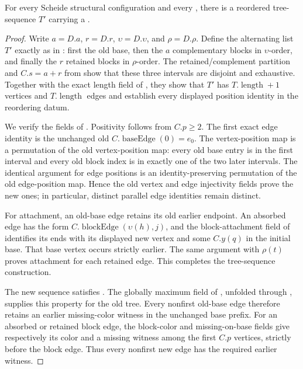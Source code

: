 \begin{helper}
For every Scheide structural configuration and every
, there is a reordered
tree-sequence $T'$ carrying a
.
\end{helper}
\begin{proof}
Write $a=D.a$, $r=D.r$, $\upsilon=D.\upsilon$, and $\rho=D.\rho$.
Define the alternating list $T'$ exactly as in
: first the old base, then the
$a$ complementary blocks in $\upsilon$-order, and finally the $r$ retained
blocks in $\rho$-order.  The retained/complement partition and
$C.s=a+r$ from  show that these
three intervals are disjoint and exhaustive.  Together with the exact
length field of , they show that
$T'$ has $T.\operatorname{length}+1$ vertices and
$T.\operatorname{length}$ edges and establish every displayed position
identity in the reordering datum.

We verify the fields of .  Positivity follows from
$C.p\ge2$.  The first exact edge identity is the unchanged old
$C.\operatorname{baseEdge}(0)=e_0$.  The vertex-position map is a
permutation of the old vertex-position map: every old base entry is in the
first interval and every old block index is in exactly one of the two
later intervals.  The identical argument for edge positions is an
identity-preserving permutation of the old edge-position map.  Hence the
old vertex and edge injectivity fields prove the new ones; in particular,
distinct parallel edge identities remain distinct.

For attachment, an old-base edge retains its old earlier endpoint.  An
absorbed edge has the form
$C.\operatorname{blockEdge}(\upsilon(h),j)$, and the block-attachment
field of  identifies its ends
with its displayed new vertex and some $C.y(q)$ in the initial base.
That base vertex occurs strictly earlier.  The same argument with
$\rho(t)$ proves attachment for each retained edge.  This completes the
tree-sequence construction.

The new sequence satisfies .  The globally maximum
field of , unfolded through
, supplies this property for the old tree.
Every nonfirst old-base edge therefore retains an earlier missing-color
witness in the unchanged base prefix.  For an absorbed or retained block
edge, the block-color and missing-on-base fields give respectively its
color and a missing witness among the first $C.p$ vertices, strictly
before the block edge.  Thus every nonfirst new edge has the required
earlier witness.


\end{proof}
